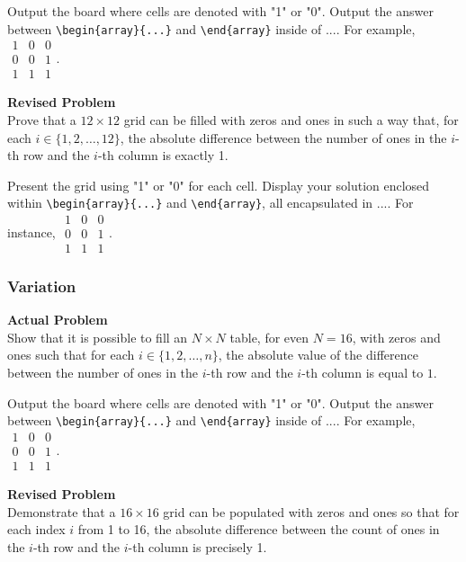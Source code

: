 Output the board where cells are denoted with "1" or "0". Output the answer between \verb|\begin{array}{...}| and \verb|\end{array}| inside of $\boxed{...}$. For example, $\boxed{\begin{array}{ccc}1 & 0 & 0 \\ 0 & 0 & 1 \\ 1 & 1 & 1\end{array}}$.

\textbf{Revised Problem}\\
Prove that a $12 \times 12$ grid can be filled with zeros and ones in such a way that, for each $i \in \{1, 2, \ldots, 12\}$, the absolute difference between the number of ones in the $i$-th row and the $i$-th column is exactly 1.

Present the grid using "1" or "0" for each cell. Display your solution enclosed within \verb|\begin{array}{...}| and \verb|\end{array}|, all encapsulated in $\boxed{...}$. For instance, $\boxed{\begin{array}{ccc}1 & 0 & 0 \\ 0 & 0 & 1 \\ 1 & 1 & 1\end{array}}$.

\subsubsection{Variation}
\textbf{Actual Problem}\\
Show that it is possible to fill an $N \times N$ table, for even $N=16$, with zeros and ones such that for each $i \in\{1,2, \ldots, n\}$, the absolute value of the difference between the number of ones in the $i$-th row and the $i$-th column is equal to $1$.

Output the board where cells are denoted with "1" or "0". Output the answer between \verb|\begin{array}{...}| and \verb|\end{array}| inside of $\boxed{...}$. For example, $\boxed{\begin{array}{ccc}1 & 0 & 0 \\ 0 & 0 & 1 \\ 1 & 1 & 1\end{array}}$.

\textbf{Revised Problem}\\
Demonstrate that a $16 \times 16$ grid can be populated with zeros and ones so that for each index $i$ from 1 to 16, the absolute difference between the count of ones in the $i$-th row and the $i$-th column is precisely 1.

